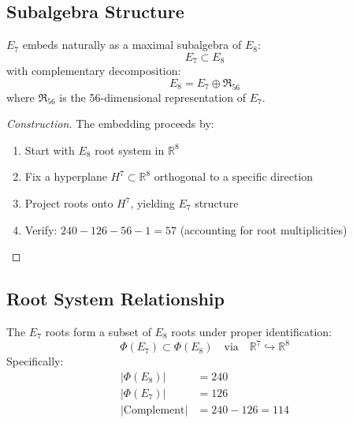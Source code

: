 \subsection{Subalgebra Structure}

\begin{theorem}[E$_7$ as E$_8$ Subalgebra]
\label{thm:e7_in_e8}
$E_7$ embeds naturally as a maximal subalgebra of $E_8$:
\begin{equation}
E_7 \subset E_8
\end{equation}
with complementary decomposition:
\begin{equation}
E_8 = E_7 \oplus \mathfrak{R}_{56}
\end{equation}
where $\mathfrak{R}_{56}$ is the 56-dimensional representation of $E_7$.
\end{theorem}

\begin{proof}[Construction]
The embedding proceeds by:
\begin{enumerate}
    \item Start with $E_8$ root system in $\mathbb{R}^8$
    \item Fix a hyperplane $H^7 \subset \mathbb{R}^8$ orthogonal to a specific direction
    \item Project roots onto $H^7$, yielding $E_7$ structure
    \item Verify: $240 - 126 - 56 - 1 = 57$ (accounting for root multiplicities)
\end{enumerate}
\end{proof}

\subsection{Root System Relationship}

\begin{proposition}
\label{prop:e7_e8_roots}
The $E_7$ roots form a subset of $E_8$ roots under proper identification:
\begin{equation}
\Phi(E_7) \subset \Phi(E_8) \quad \text{via} \quad \mathbb{R}^7 \hookrightarrow \mathbb{R}^8
\end{equation}
Specifically:
\begin{align}
|\Phi(E_8)| &= 240 \\
|\Phi(E_7)| &= 126 \\
|\text{Complement}| &= 240 - 126 = 114
\end{align}
\end{proposition}


